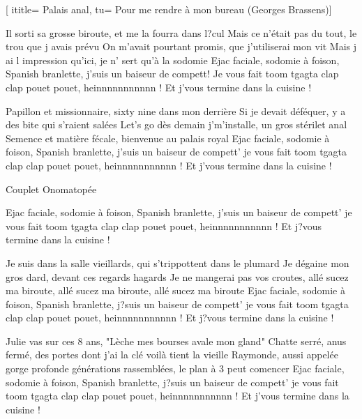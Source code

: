  [
ititle= {Palais anal},
tu= {Pour me rendre à mon bureau (Georges Brassens)}]


\beginverse
Il sorti sa grosse biroute, et me la fourra dans l?cul
Mais ce n'était pas du tout, le trou que j avais prévu
On m'avait pourtant promis, que j'utiliserai mon vit
Mais j ai l impression qu'ici, je n' sert qu'à la sodomie
Ejac faciale, sodomie à foison,
Spanish branlette, j'suis un baiseur de compett!
Je vous fait toom tgagta clap clap pouet pouet,
heinnnnnnnnnnn !
Et j'vous termine dans la cuisine !
\endverse

\beginverse
Papillon et missionnaire, sixty nine dans mon derrière
Si je devait déféquer, y a des bite qui s'raient salées
Let's go dès demain j'm'installe, un gros stérilet anal
Semence et matière fécale, bienvenue au palais royal
Ejac faciale, sodomie à foison,
Spanish branlette, j'suis un baiseur de compett'
je vous fait toom tgagta clap clap pouet pouet,
heinnnnnnnnnnn !
Et j'vous termine dans la cuisine !
\endverse

\beginverse
Couplet Onomatopée
\endverse

\beginverse
Ejac faciale, sodomie à foison,
Spanish branlette, j'suis un baiseur de compett'
je vous fait toom tgagta clap clap pouet pouet,
heinnnnnnnnnnn !
Et j?vous termine dans la cuisine !
\endverse

\beginverse
Je suis dans la salle vieillards, qui s'trippottent dans le plumard
Je dégaine mon gros dard, devant ces regards hagards
Je ne mangerai pas vos croutes, allé sucez ma biroute,
allé sucez ma biroute, allé sucez ma biroute
Ejac faciale, sodomie à foison,
Spanish branlette, j?suis un baiseur de compett'
je vous fait toom tgagta clap clap pouet pouet,
heinnnnnnnnnnn !
Et j?vous termine dans la cuisine !
\endverse

\beginverse
Julie vas sur ces 8 ans, "Lèche mes bourses avale mon gland"
Chatte serré, anus fermé, des portes dont j'ai la clé
voilà tient la vieille Raymonde, aussi appelée gorge profonde
générations rassemblées, le plan à 3 peut comencer
Ejac faciale, sodomie à foison,
Spanish branlette, j?suis un baiseur de compett'
je vous fait toom tgagta clap clap pouet pouet,
heinnnnnnnnnnn !
Et j'vous termine dans la cuisine !
\endverse

\endsong
